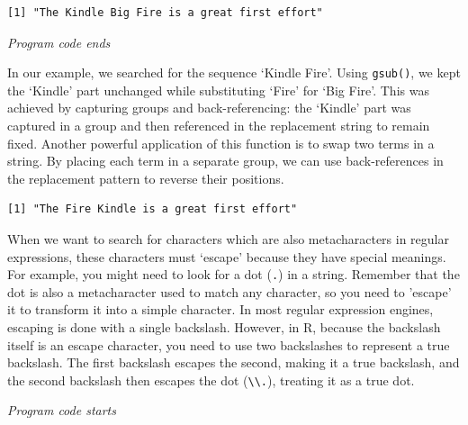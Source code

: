\begin{verbatim}
[1] "The Kindle Big Fire is a great first effort"
\end{verbatim}

\emph{Program code ends}

In our example, we searched for the sequence `Kindle Fire'. Using
\texttt{gsub()}, we kept the `Kindle' part unchanged while substituting
`Fire' for `Big Fire'. This was achieved by capturing groups and
back-referencing: the `Kindle' part was captured in a group and then
referenced in the replacement string to remain fixed. Another powerful
application of this function is to swap two terms in a string. By placing each term in a
separate group, we can use back-references in the replacement pattern to
reverse their positions.

\begin{Shaded}
\begin{Highlighting}[]
\NormalTok{(}\NormalTok{, }\SpecialCharTok{\textbackslash{}\textbackslash{}}\SpecialCharTok{\textbackslash{}\textbackslash{}}
\end{Highlighting}
\end{Shaded}

\begin{verbatim}
[1] "The Fire Kindle is a great first effort"
\end{verbatim}

When we want to search for characters which are also metacharacters in
regular expressions, these characters must `escape' because they
have special meanings. For example, you might need to look for a dot (\texttt{.}) in a string. Remember that the dot
is also a metacharacter used to match any character, so you need to
'escape' it to transform it into a simple character. In most regular
expression engines, escaping is done with a single backslash. However,
in R, because the backslash itself is an escape character, you need to use two backslashes to represent a true
backslash. The first backslash escapes the second, making it a true
backslash, and the second backslash then escapes the dot
(\texttt{\textbackslash{}\textbackslash{}.}), treating it as a true
dot.

\emph{Program code starts}

\begin{Shaded}
\begin{Highlighting}[]
\NormalTok{(}\SpecialCharTok{\textbackslash{}\textbackslash{}} \NormalTok{)}
\end{Highlighting}
\end{Shaded}

